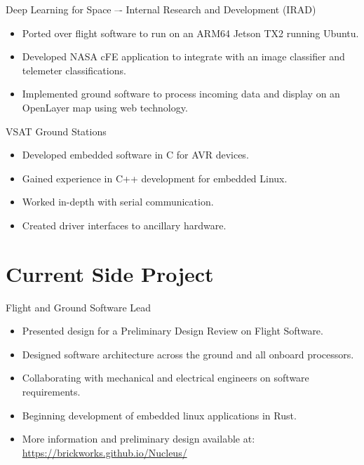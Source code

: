 \documentclass[10pt,final,sans]{resume}
\begin{document}
Deep Learning for Space –- Internal Research and Development (IRAD)
\begin{itemize}
  \item Ported over flight software to run on an ARM64 Jetson TX2 running Ubuntu.
  \item Developed NASA cFE application to integrate with an image classifier and telemeter classifications.
  \item Implemented ground software to process incoming data and display on an OpenLayer map using web technology.
\end{itemize}
VSAT Ground Stations
\begin{itemize}
  \item Developed embedded software in C for AVR devices.
  \item Gained experience in C++ development for embedded Linux.
  \item Worked in-depth with serial communication.
  \item Created driver interfaces to ancillary hardware.
\end{itemize}

\section{Current Side Project}
Flight and Ground Software Lead
\begin{itemize}
  \item Presented design for a Preliminary Design Review on Flight Software.
  \item Designed software architecture across the ground and all onboard processors.
  \item Collaborating with mechanical and electrical engineers on software requirements.
  \item Beginning development of embedded linux applications in Rust.
  \item More information and preliminary design available at: \href{brickworks.github.io/Nucleus/}{https://brickworks.github.io/Nucleus/}
\end{itemize}
\end{document}
